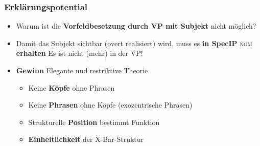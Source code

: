 \begin{frame}
	\frametitle{Erklärungspotential}
	
	
	\begin{itemize}
		\item Warum ist die \textbf{Vorfeldbesetzung durch VP mit Subjekt} nicht möglich?
		\eal 
		\zl
		
		\pause
		\item Damit das Subjekt sichtbar (overt realisiert) wird, muss es \textbf{in SpecIP} \textsc{nom} \textbf{erhalten} \ras Es ist nicht (mehr) in der VP!
		
	\end{itemize}		
	
	\pause
	\begin{itemize}
		\item \textbf{Gewinn} \ras Elegante und restriktive Theorie \nocite{Haspelmath94a}
		
		\begin{itemize}
			\item Keine \textbf{Köpfe} ohne Phrasen
			\item Keine \textbf{Phrasen} ohne Köpfe (exozentrische Phrasen)
			\item Strukturelle \textbf{Position} bestimmt Funktion
			\item \textbf{Einheitlichkeit} der X-Bar-Struktur
		\end{itemize}		
		
	\end{itemize}
	
\end{frame}


